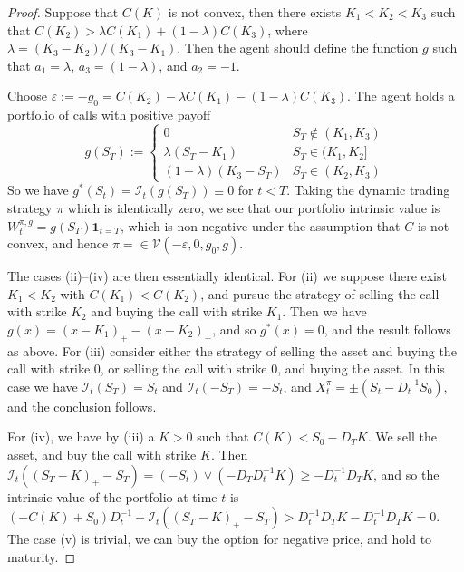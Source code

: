 \documentclass[a4paper]{amsart}
\theoremstyle{definition}
\theoremstyle{remark}
\numberwithin{equation}{section}
\newcommand{\eps}{\varepsilon}
\newcommand{\ind}{\boldsymbol{1}}
\newcommand{\Vc}{\mathcal{V}}
\newcommand{\In}{\mathcal{I}} %
\begin{document}
\begin{proof}
  Suppose that $C(K)$ is not convex, then there exists $K_1 < K_2 < K_3$ such that $C(K_2) > \lambda C(K_1) + (1-\lambda) C(K_3)$, where $\lambda = (K_3-K_2)/(K_3-K_1)$. Then the agent should define the function $g$ such that $a_1 = \lambda$, $a_3 = (1-\lambda)$, and $a_2 = -1$.

  Choose $\eps:= -g_0 = C(K_2) - \lambda C(K_1) - (1-\lambda) C(K_3)$. The agent holds a portfolio of calls with positive payoff
  \begin{equation*}
    g(S_T) := 
    \begin{cases}
      0 & S_T \not\in( K_1,K_3)\\
      \lambda (S_T-K_1) & S_T \in (K_1,K_2]\\
      (1-\lambda)(K_3-S_T) & S_T \in (K_2,K_3)
    \end{cases}
  \end{equation*}
  So we have $g^*(S_t) = \In_t(g(S_T)) \equiv 0$ for $t<T$. Taking the dynamic trading strategy $\pi$ which is identically zero, we see that our portfolio intrinsic value is $W_t^{\pi,g} = g(S_T)\ind_{t=T}$, which is non-negative under the assumption that $C$ is not convex, and hence $\pi = \in \Vc(-\eps,0,g_0,g)$.

  The cases (ii)--(iv) are then essentially identical. For (ii) we suppose there exist $K_1 < K_2$ with $C(K_1) < C(K_2)$, and pursue the strategy of selling the call with strike $K_2$ and buying the call with strike $K_1$. Then we have $g(x) = (x-K_1)_+ - (x-K_2)_+$, and so $g^*(x) = 0$, and the result follows as above. For (iii) consider either the strategy of selling the asset and buying the call with strike $0$, or selling the call with strike 0, and buying the asset. In this case we have $\In_t(S_T) = S_t$ and $\In_t(-S_T) = -S_t$, and $X_t^{\pi} = \pm(S_t-D_t^{-1} S_0)$, and the conclusion follows.

  For (iv), we have by (iii) a $K>0$ such that $C(K) < S_0 -D_TK$. We sell the asset, and buy the call with strike $K$. Then $\In_t((S_T-K)_+-S_T) = (-S_t) \vee (-D_T D_t^{-1} K) \ge -D_t^{-1} D_T K$, and so the intrinsic value of the portfolio at time $t$ is $(-C(K)+S_0) D_t^{-1} + \In_t((S_T-K)_+ - S_T) > D_t^{-1} D_T K - D_t^{-1} D_T K = 0$. The case (v) is trivial, we can buy the option for negative price, and hold to maturity.
\end{proof}
\end{document}
